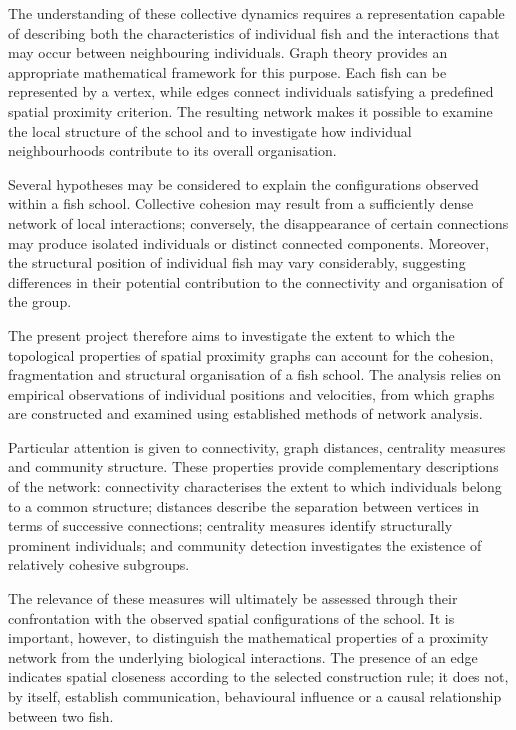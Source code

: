 \documentclass[10pt,a4paper]{article}
\begin{document}
The understanding of these collective dynamics requires a
representation capable of describing both the characteristics
of individual fish and the interactions that may occur between
neighbouring individuals. Graph theory provides an appropriate
mathematical framework for this purpose. Each fish can be
represented by a vertex, while edges connect individuals
satisfying a predefined spatial proximity criterion. The
resulting network makes it possible to examine the local
structure of the school and to investigate how individual
neighbourhoods contribute to its overall organisation.

Several hypotheses may be considered to explain the
configurations observed within a fish school. Collective
cohesion may result from a sufficiently dense network of
local interactions; conversely, the disappearance of certain
connections may produce isolated individuals or distinct
connected components. Moreover, the structural position of
individual fish may vary considerably, suggesting differences
in their potential contribution to the connectivity and
organisation of the group.

The present project therefore aims to investigate the extent
to which the topological properties of spatial proximity
graphs can account for the cohesion, fragmentation and
structural organisation of a fish school. The analysis relies
on empirical observations of individual positions and
velocities, from which graphs are constructed and examined
using established methods of network analysis.

Particular attention is given to connectivity, graph
distances, centrality measures and community structure.
These properties provide complementary descriptions of the
network: connectivity characterises the extent to which
individuals belong to a common structure; distances describe
the separation between vertices in terms of successive
connections; centrality measures identify structurally
prominent individuals; and community detection investigates
the existence of relatively cohesive subgroups.

The relevance of these measures will ultimately be assessed
through their confrontation with the observed spatial
configurations of the school. It is important, however, to
distinguish the mathematical properties of a proximity network
from the underlying biological interactions. The presence of
an edge indicates spatial closeness according to the selected
construction rule; it does not, by itself, establish
communication, behavioural influence or a causal relationship
between two fish.
\end{document}
